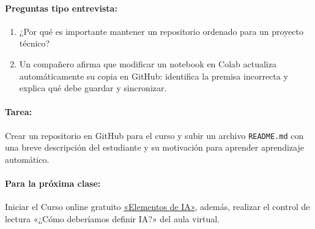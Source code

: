 \documentclass[a4,11pt]{aleph-notas}
\begin{document}
\paragraph{Preguntas tipo entrevista:}
\begin{enumerate}[leftmargin=*]
    \item ¿Por qué es importante mantener un repositorio ordenado para un proyecto técnico?
    \item Un compañero afirma que modificar un notebook en Colab actualiza automáticamente su copia en GitHub: identifica la premisa incorrecta y explica qué debe guardar y sincronizar.
\end{enumerate}

\paragraph{Tarea:}
Crear un repositorio en GitHub para el curso y subir un archivo \texttt{README.md} con una breve descripción del estudiante y su motivación para aprender aprendizaje automático.

\paragraph{Para la próxima clase:}
Iniciar el Curso online gratuito \href{https://www.elementsofai.com/es}{«Elementos de IA»}, además, realizar el control de lectura «¿Cómo deberíamos definir IA?» del aula virtual.
\end{document}
